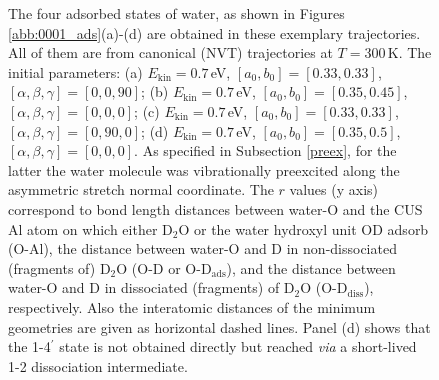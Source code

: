 \documentclass[11pt,DIV=13,BCOR=5mm,a4paper,headinclude]{scrbook}
\begin{document}
\begin{figure}[h!]
\caption{The four adsorbed states of water, as shown in Figures \ref{abb:0001_ads}(a)-(d) are obtained in these exemplary trajectories.
All of them are from canonical (NVT) trajectories at  $T=300\,$K.
The initial parameters: (a) $E_\textrm{kin}=0.7\,$eV, $[a_0,b_0]=[0.33,0.33]$, $[\alpha,\beta,\gamma]=[0,0,90]$;
 (b) $E_\textrm{kin}=0.7\,$eV, $[a_0,b_0]=[0.35,0.45]$, $[\alpha,\beta,\gamma]=[0,0,0]$;
 (c) $E_\textrm{kin}=0.7\,$eV, $[a_0,b_0]=[0.33,0.33]$, $[\alpha,\beta,\gamma]=[0,90,0]$;
 (d) $E_\textrm{kin}=0.7\,$eV, $[a_0,b_0]=[0.35,0.5]$, $[\alpha,\beta,\gamma]=[0,0,0]$.
As specified in Subsection \ref{preex}, for the latter the water molecule was vibrationally preexcited along the asymmetric stretch normal coordinate.
The $r$ values (y axis) correspond to bond length distances between water-O and the CUS Al atom on which either D$_2$O or the water hydroxyl unit OD adsorb (O-Al), the distance between water-O and D in non-dissociated (fragments of) D$_2$O (O-D or O-D$_\textrm{ads}$), and the  distance between water-O and D in dissociated (fragments) of D$_2$O (O-D$_\textrm{diss}$), respectively.
Also the interatomic distances of the minimum geometries are given as horizontal dashed lines.
Panel (d) shows that the 1-4$^\prime$ state is not obtained directly but reached \textit{via} a short-lived 1-2 dissociation intermediate.}
\label{abb:ex_traj}
\end{figure}
\end{document}
